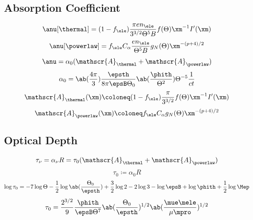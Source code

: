 \subsection{Absorption Coefficient}
\begin{equation}
  \anu[\thermal]
  =
  (1-f_{\ele})
  \frac{\pi e n_{\ele}}{3^{3/2}\Theta^5 B}
  f(\Theta)
  \xm^{-1}
  I'(\xm)
\end{equation}
\begin{equation}
  \anu[\powerlaw]
  =
  f_{\ele}
  C_{\alpha}
  \frac{e n_{\ele}}{\Theta^5 B}
  g_N(\Theta)
  \xm^{-(p+4)/2}
\end{equation}
\begin{equation}
  \anu
  =
  \alpha_0
  (
    \mathscr{A}_{\thermal}
    +
    \mathscr{A}_{\powerlaw}
  )
\end{equation}
\begin{equation}
  \alpha_0
  =
  \ab(\frac{4\pi}{3})
  \frac{\epsth}{8\pi\epsB\Theta_0}
  \ab(\frac{\phith}{\Theta^2})
  \Theta^{-5}
  \frac{1}{ct}
\end{equation}
\begin{equation}
  \mathscr{A}_{\thermal}(\xm)
  \coloneq
  (1-f_{\ele})
  \frac{\pi}{3^{3/2}}
  f(\Theta)
  \xm^{-1}
  I'(\xm)
\end{equation}
\begin{equation}
  \mathscr{A}_{\powerlaw}(\xm)
  \coloneq
  f_{\ele}
  C_{\alpha}
  g_N(\Theta)
  \xm^{-(p+4)/2}
\end{equation}
\subsection{Optical Depth}
\begin{equation}
  \tau_{\nu}
  =
  \alpha_{\nu}R
  =
  \tau_0
  (
    \mathscr{A}_{\thermal}
    +
    \mathscr{A}_{\powerlaw}
  )
\end{equation}
\begin{equation}
  \tau_0
  \coloneq
  \alpha_0 R
\end{equation}
\begin{equation}
  \log{\tau_0}
  =
  -7\log{\Theta}
  -\frac{1}{2}\log\ab(\frac{\Theta_0}{\epsth})
  +\frac{3}{2}\log{2}
  -2\log{3}
  -\log{\epsB}
  +\log{\phith}
  +\frac{1}{2}\log{\Mep}
\end{equation}
\begin{equation}
  \tau_0
  =
  \frac{2^{3/2}}{9}
  \frac{\phith}{\epsB\Theta^7}
  \ab(\frac{\Theta_0}{\epsth})^{1/2}
  \ab(\frac{\mue \mele}{\mu\mpro})^{1/2}
\end{equation}
